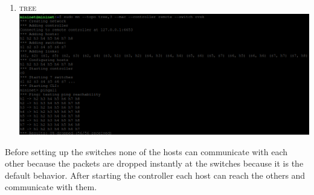 \documentclass{article}
\begin{document}
\begin{adjustwidth}{2em}{2em}
\begin{adjustwidth}{2em}{2em}
\begin{enumerate}
			\item \textsc{tree} \\
			\includegraphics[scale=0.5]{tree_after.png} \\
		\end{enumerate}
		\end{adjustwidth}
		Before setting up the switches none of the hosts can communicate with each other because the packets are dropped instantly at the switches because it is the default behavior. After starting the controller each host can reach the others and communicate with them.
	\end{adjustwidth}
	
\end{document}
